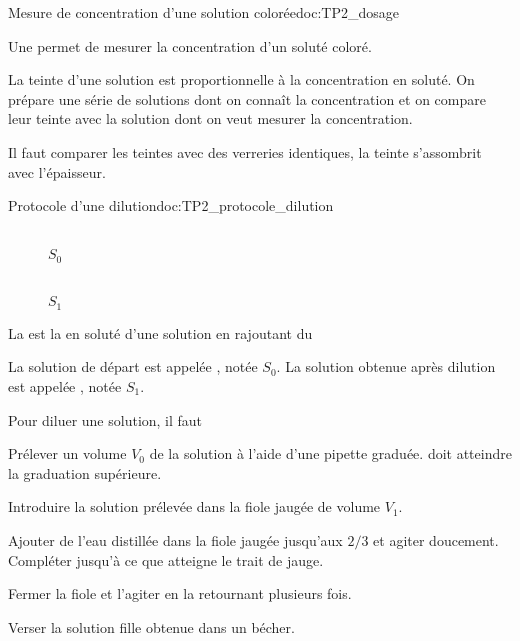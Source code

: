 \begin{doc}{Mesure de concentration d'une solution colorée}{doc:TP2_dosage}  
  \begin{importants}
    Une  permet de mesurer la concentration d'un soluté coloré.
  \end{importants}

  La teinte d'une solution est proportionnelle à la concentration en soluté.
  On prépare une série de solutions  dont on connaît la concentration et on compare leur teinte avec la solution dont on veut mesurer la concentration.
  
  \attention Il faut comparer les teintes avec des verreries identiques, la teinte s'assombrit avec l'épaisseur.
\end{doc}


\begin{doc}{Protocole d'une dilution}{doc:TP2_protocole_dilution}
  \begin{wrapfigure}[5]{r}{0.5\linewidth}
    \vspace*{-20pt}
    \centering
    \begin{multicols}{4}
     \\[0pt]
    \footnotesize{$S_0$}
    
    
    
     \\[0pt]
    \footnotesize{$S_1$}
    \end{multicols}
  \end{wrapfigure}
  \vAligne{-40pt}
  
  \begin{importants}
    La  est la  en soluté d'une solution en rajoutant du 
  \end{importants}
  La solution de départ est appelée , notée $S_0$.
  La solution obtenue après dilution est appelée , notée $S_1$.

  Pour diluer une solution, il faut
  \begin{protocole}
    \item Prélever un volume $V_0$ de la solution à l'aide d'une pipette graduée.
     doit atteindre la graduation supérieure.
    \item Introduire la solution prélevée dans la fiole jaugée de volume $V_1$.
    \item Ajouter de l'eau distillée dans la fiole jaugée jusqu'aux $2/3$ et agiter doucement.
    Compléter jusqu'à ce que  atteigne le trait de jauge.
    \item Fermer la fiole et l'agiter en la retournant plusieurs fois.
    \item Verser la solution fille obtenue dans un bécher.
  \end{protocole}
\end{doc}

